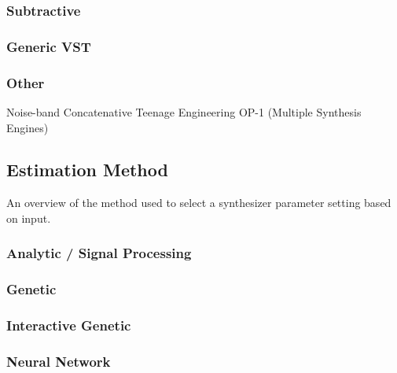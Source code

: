 \subsubsection{Subtractive}
\cite{roth2011comparison}

\subsubsection{Generic VST}
\cite{yee2008synthbot}\cite{heise2009automatic}

\subsubsection{Other}
Noise-band \cite{chinen2007genesynth}
Concatenative \cite{stowell2010making}
Teenage Engineering OP-1 (Multiple Synthesis Engines) \cite{macret2013automatic}

\subsection{Estimation Method}
An overview of the method used to select a synthesizer parameter setting based on input.

\subsubsection{Analytic / Signal Processing}
\cite{justice1979analytic}\cite{beauchamp1982synthesis}\cite{payne1987microcomputer}\cite{ethington1994seawave}

\subsubsection{Genetic}
\cite{horner1993machine}\cite{fujinaga1994genetic}\cite{horner1995envelope}\cite{horner1995wavetable}\cite{riionheimo2003parameter}\cite{mandelis2003musical}\cite{mitchell2005frequency}\cite{mitchell2007evolutionary}
\cite{chinen2007genesynth}\cite{yee2008synthbot}\cite{roth2011comparison}\cite{macret2012automatic}\cite{hamadicharef2012intelligent}\cite{macret2013automatic}

\subsubsection{Interactive Genetic}
\cite{johnson1999exploring}

\subsubsection{Neural Network}
\cite{johnson2006timbre}\cite{roth2011comparison}\cite{zhang2018visualization}\cite{barkan2019deep}

